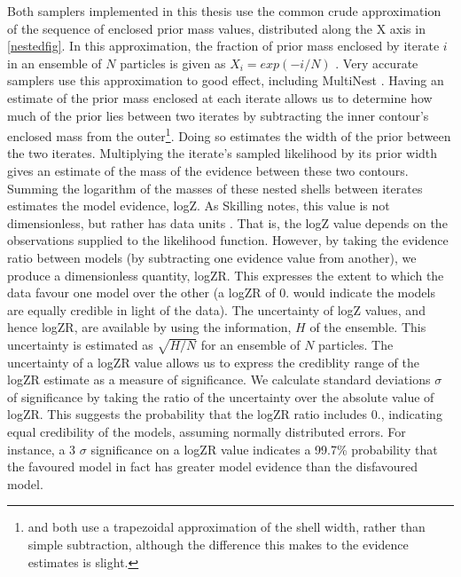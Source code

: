 \documentclass{ut-thesis}
\begin{document}
\begin{NoHyper}
Both samplers implemented in this thesis use the common crude approximation of the sequence of enclosed prior mass values, distributed along the X axis in \autoref{nestedfig}. In this approximation, the fraction of prior mass enclosed by iterate $i$ in an ensemble of $N$ particles is given as $X_{i}=exp(-i/N)$ \cite{Skilling2006}. Very accurate samplers use this approximation to good effect, including MultiNest \cite{Feroz2009}. Having an estimate of the prior mass enclosed at each iterate allows us to determine how much of the prior lies between two iterates by subtracting the inner contour's enclosed mass from the outer\footnote{ and  both use a trapezoidal approximation of the shell width, rather than simple subtraction, although the difference this makes to the evidence estimates is slight.}. Doing so estimates the width of the prior between the two iterates. Multiplying the iterate's sampled likelihood by its prior width gives an estimate of the mass of the evidence between these two contours. Summing the logarithm of the masses of these nested shells between iterates estimates the model evidence, logZ. As Skilling notes, this value is not dimensionless, but rather has data units \cite{Skilling2012}. That is, the logZ value depends on the observations supplied to the likelihood function. However, by taking the evidence ratio between models (by subtracting one evidence value from another), we produce a dimensionless quantity, logZR. This expresses the extent to which the data favour one model over the other (a logZR of 0. would indicate the models are equally credible in light of the data). The uncertainty of logZ values, and hence logZR, are available by using the information, $H$ of the ensemble. This uncertainty is estimated as $\sqrt{H/N}$ for an ensemble of $N$ particles. The uncertainty of a logZR value allows us to express the crediblity range of the logZR estimate as a measure of significance. We calculate standard deviations $\sigma$ of significance by taking the ratio of the uncertainty over the absolute value of logZR. This suggests the probability that the logZR ratio includes 0., indicating equal credibility of the models, assuming normally distributed errors. For instance, a 3 $\sigma$ significance on a logZR value indicates a 99.7\% probability that the favoured model in fact has greater model evidence than the disfavoured model.


\end{NoHyper}
\end{document}
